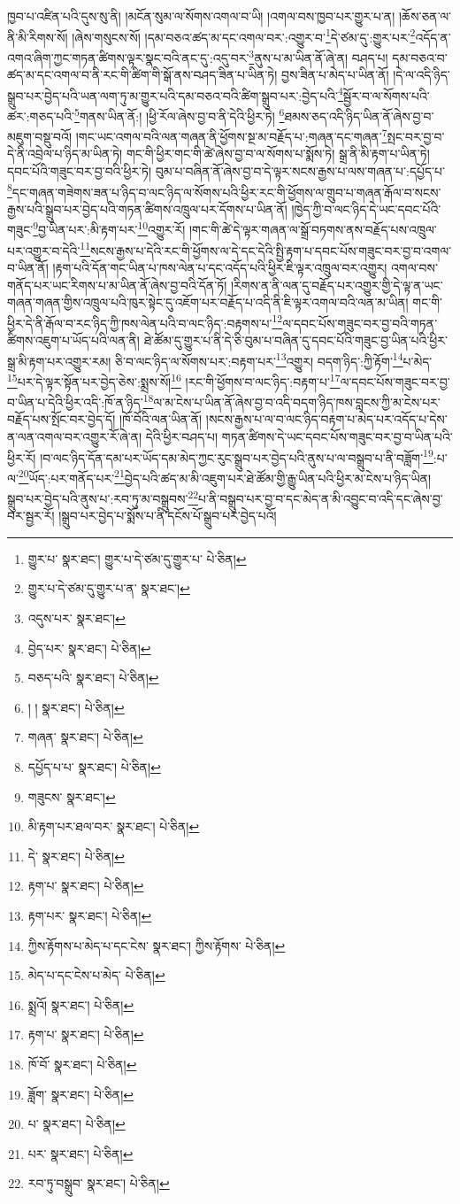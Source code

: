 ཁྱབ་པ་འཛིན་པའི་དུས་སུ་ནི། །མངོན་སུམ་ལ་སོགས་འགལ་བ་ཡི། །འགལ་བས་ཁྱབ་པར་གྱུར་པ་ན། །ཆོས་ཅན་ལ་ནི་མི་རིགས་སོ། །ཞེས་གསུངས་སོ། །དམ་བཅའ་ཚད་མ་དང་འགལ་བར་:འགྱུར་བ་\footnote{གྱུར་པ་  སྣར་ཐང་། གྱུར་པ་དེ་ཙམ་དུ་གྱུར་པ་  པེ་ཅིན། }དེ་ཙམ་དུ་:གྱུར་པར་\footnote{གྱུར་པ་དེ་ཙམ་དུ་གྱུར་པ་ན་  སྣར་ཐང་། }འདོད་ན་འགའ་ཞིག་ཀྱང་གཏན་ཚིགས་ལྟར་སྣང་བའི་ནང་དུ་:འདུ་བར་\footnote{འདུས་པར་  སྣར་ཐང་། }ནུས་པ་མ་ཡིན་ནོ་ཞེ་ན། བཤད་པ། དམ་བཅའ་བ་ཚད་མ་དང་འགལ་བ་ནི་རང་གི་ཚིག་གི་སྒོ་ནས་བཤད་ཟིན་པ་ཡིན་ཏེ། བྱས་ཟིན་པ་མེད་པ་ཡིན་ནོ། །དེ་ལ་འདི་ཉིད་སྒྲུབ་པར་བྱེད་པའི་ཡན་ལག་ཏུ་མ་གྱུར་པའི་དམ་བཅའ་བའི་ཚིག་སྒྲུབ་པར་:བྱེད་པའི་\footnote{བྱེད་པར་  སྣར་ཐང་།  པེ་ཅིན། }སྦྱོར་བ་ལ་སོགས་པའི་ཚར་:གཅད་པའི་\footnote{བཅད་པའི་  སྣར་ཐང་།  པེ་ཅིན། }གནས་ཡིན་ནོ:། །ཕྱི་རོལ་ཞེས་བྱ་བ་ནི་དེའི་ཕྱིར་ཏེ། \footnote{། །   སྣར་ཐང་།  པེ་ཅིན། }ཐམས་ཅད་འདི་ཉིད་ཡིན་ནོ་ཞེས་བྱ་བ་མཇུག་བསྡུ་བའོ། །གང་ཡང་འགལ་བའི་ལན་གཞན་ནི་ཕྱོགས་སྔ་མ་བརྗོད་པ་:གཞན་དང་གཞན་\footnote{གཞན་  སྣར་ཐང་།  པེ་ཅིན། }སྤང་བར་བྱ་བ་དེ་ནི་འབྲེལ་པ་ཉིད་མ་ཡིན་ཏེ། གང་གི་ཕྱིར་གང་གི་ཚེ་ཞེས་བྱ་བ་ལ་སོགས་པ་སྨོས་ཏེ། སྒྲ་ནི་མི་རྟག་པ་ཡིན་ཏེ། དབང་པོའི་གཟུང་བར་བྱ་བའི་ཕྱིར་ཏེ། བུམ་པ་བཞིན་ནོ་ཞེས་བྱ་བ་དེ་ལྟར་སངས་རྒྱས་པ་ལས་གཞན་པ་:དཔྱོད་པ་\footnote{དཔྱོད་པ་པ་  སྣར་ཐང་།  པེ་ཅིན། }དང་གཞན་གཟེགས་ཟན་པ་ཉིད་བ་ལང་ཉིད་ལ་སོགས་པའི་ཕྱིར་རང་གི་ཕྱོགས་ལ་གྲུབ་པ་གཞན་རྒོལ་བ་སངས་རྒྱས་པའི་སྒྲུབ་པར་བྱེད་པའི་གཏན་ཚིགས་འཁྲུལ་པར་དོགས་པ་ཡིན་ནོ། །ཁྱེད་ཀྱི་བ་ལང་ཉིད་དེ་ཡང་དབང་པོའི་གཟུང་\footnote{གཟུངས་  སྣར་ཐང་། }བྱ་ཡིན་པར་:མི་རྟག་པར་\footnote{མི་རྟག་པར་ཐལ་བར་  སྣར་ཐང་།  པེ་ཅིན། }འགྱུར་རོ། །གང་གི་ཚེ་དེ་ལྟར་གཞན་ལ་སྒྲོ་བཏགས་ནས་བརྗོད་པས་འཁྲུལ་པར་འགྱུར་བ་དེའི་\footnote{དེ་  སྣར་ཐང་།  པེ་ཅིན། }སངས་རྒྱས་པ་དེའི་རང་གི་ཕྱོགས་ལ་དེ་དང་དེའི་སྤྱི་རྟག་པ་དབང་པོས་གཟུང་བར་བྱ་བ་འགལ་བ་ཡིན་ནོ། །རྟག་པའི་དོན་གང་ཡིན་པ་ཁས་ལེན་པ་དང་འདོད་པའི་ཕྱིར་ཇི་ལྟར་འཁྲུལ་བར་འགྱུར། འགལ་བས་གནོད་པར་ཡང་རིགས་པ་མ་ཡིན་ནོ་ཞེས་བྱ་བའི་དོན་ཏོ། །རིགས་ན་ནི་ལན་དུ་བརྗོད་པར་འགྱུར་གྱི་དེ་ལྟ་ན་ཡང་གཞན་གཞན་གྱིས་འཁྲུལ་པའི་ཁུར་སྟེང་དུ་འཇོག་པར་བརྗོད་པ་འདི་ནི་ཇི་ལྟར་འགལ་བའི་ལན་མ་ཡིན། གང་གི་ཕྱིར་དེ་ནི་རྒོལ་བ་རང་ཉིད་ཀྱི་ཁས་ལེན་པའི་བ་ལང་ཉིད་:བརྟགས་པ་\footnote{རྟག་པ་  སྣར་ཐང་།  པེ་ཅིན། }ལ་དབང་པོས་གཟུང་བར་བྱ་བའི་གཏན་ཚིགས་འཇུག་པ་ཡོད་པའི་ལན་ནི། ཐེ་ཚོམ་དུ་གྱུར་པ་ནི་དེ་ཅི་བུམ་པ་བཞིན་དུ་དབང་པོའི་གཟུང་བྱ་ཡིན་པའི་ཕྱིར་སྒྲ་མི་རྟག་པར་འགྱུར་རམ། ཅི་བ་ལང་ཉིད་ལ་སོགས་པར་:བརྟག་པར་\footnote{རྟག་པར་  སྣར་ཐང་།  པེ་ཅིན། }འགྱུར། བདག་ཉིད་:ཀྱི་རྟོག་\footnote{ཀྱིས་རྟོགས་པ་མེད་པ་དང་ངེས་  སྣར་ཐང་། ཀྱིས་རྟོགས་  པེ་ཅིན། }པ་མེད་\footnote{མེད་པ་དང་ངེས་པ་མེད་  པེ་ཅིན། }པར་དེ་ལྟར་སྟོན་པར་བྱེད་ཅེས་:སྨྲས་སོ།\footnote{སྨྲའོ།  སྣར་ཐང་།  པེ་ཅིན། } །རང་གི་ཕྱོགས་བ་ལང་ཉིད་:བརྟག་པ་\footnote{རྟག་པ་  སྣར་ཐང་།  པེ་ཅིན། }ལ་དབང་པོས་གཟུང་བར་བྱ་བ་ཡིན་པ་དེའི་ཕྱིར་འདི་:ཁོ་ན་ཉིད་\footnote{ཁོ་བོ་  སྣར་ཐང་།  པེ་ཅིན། }ལ་མ་ངེས་པ་ཡིན་ནོ་ཞེས་བྱ་བ་འདི་བདག་ཉིད་ཁས་བླངས་ཀྱི་མ་ངེས་པར་བརྗོད་པས་སྤོང་བར་བྱེད་དོ། །ཁོ་བོའི་ལན་ཡིན་ནོ། །སངས་རྒྱས་པ་ལ་བ་ལང་ཉིད་བརྟག་པ་མེད་པར་འདོད་པ་དེས་ན་ལན་འགལ་བར་འགྱུར་རོ་ཞེ་ན། དེའི་ཕྱིར་བཤད་པ། གཏན་ཚིགས་དེ་ཡང་དབང་པོས་གཟུང་བར་བྱ་བ་ཡིན་པའི་ཕྱིར་རོ། །བ་ལང་ཉིད་དོན་དམ་པར་ཡོད་དམ་མེད་ཀྱང་རུང་སྒྲུབ་པར་བྱེད་པའི་ནུས་པ་ལ་བསྒྲུབ་པ་ནི་བཟློག་\footnote{ཟློག་  སྣར་ཐང་།  པེ་ཅིན། }:པ་ལ་\footnote{པ་  སྣར་ཐང་།  པེ་ཅིན། }ཡོད་:པར་གནོད་པར་\footnote{པར་  སྣར་ཐང་།  པེ་ཅིན། }བྱེད་པའི་ཚད་མ་མི་འཇུག་པར་ཐེ་ཚོམ་གྱི་རྒྱུ་ཡིན་པའི་ཕྱིར་མ་ངེས་པ་ཉིད་ཡིན། སྒྲུབ་པར་བྱེད་པའི་ནུས་པ་:རབ་ཏུ་མ་བསྒྲུབས་\footnote{རབ་ཏུ་བསྒྲུབ་  སྣར་ཐང་།  པེ་ཅིན། }པ་ནི་བསྒྲུབ་པར་བྱ་བ་དང་མེད་ན་མི་འབྱུང་བ་འདི་དང་ཞེས་བྱ་བར་སྦྱར་རོ། །སྒྲུབ་པར་བྱེད་པ་སྨོས་པ་ནི་དངོས་པོ་སྒྲུབ་པར་བྱེད་པའོ། 